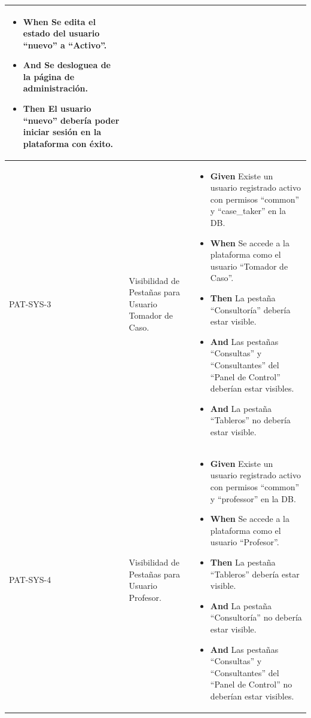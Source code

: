 \begin{longtable}{|p{1cm}|p{2.5cm}|p{12cm}|}
\begin{itemize}
        \item \textbf{When} Se edita el estado del usuario ``nuevo'' a ``Activo''.
        \item \textbf{And} Se desloguea de la página de administración.
        \newline
        \item \textbf{Then} El usuario ``nuevo'' debería poder iniciar sesión en la plataforma con éxito.
    \end{itemize}
    \\
    \hline
    PAT-SYS-3 & Visibilidad de Pestañas para Usuario Tomador de Caso.  &          
    \begin{itemize}
        \item \textbf{Given} Existe un usuario registrado activo con permisos ``common'' y ``case\_taker'' en la DB.
        \newline
        \item \textbf{When} Se accede a la plataforma como el usuario ``Tomador de Caso''.
        \newline
        \item \textbf{Then} La pestaña ``Consultoría'' debería estar visible.
        \item \textbf{And} Las pestañas ``Consultas'' y ``Consultantes'' del ``Panel de Control'' deberían estar visibles.
        \item \textbf{And} La pestaña ``Tableros'' no debería estar visible.
    \end{itemize}
    \\
    \hline
    PAT-SYS-4 & Visibilidad de Pestañas para Usuario Profesor. &  
    \begin{itemize}
        \item \textbf{Given} Existe un usuario registrado activo con permisos ``common'' y ``professor'' en la DB.
        \newline
        \item \textbf{When} Se accede a la plataforma como el usuario ``Profesor''.
        \newline
        \item \textbf{Then} La pestaña ``Tableros'' debería estar visible.
        \item \textbf{And} La pestaña ``Consultoría'' no debería estar visible.
        \item \textbf{And} Las pestañas ``Consultas'' y ``Consultantes'' del ``Panel de Control'' no deberían estar visibles.
    \end{itemize}   
    \\

\end{longtable}
